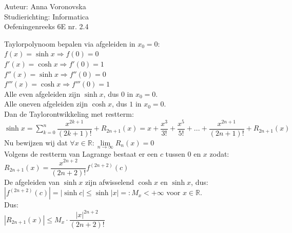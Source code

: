 \documentclass[a4paper]{article}
\begin{document}
  
\noindent \large Auteur: Anna Voronovska \\
\noindent \large Studierichting: Informatica\\
\noindent \large Oefeningenreeks 6E nr. 2.4\\

\medskip

\normalsize


Taylorpolynoom bepalen via afgeleiden in $x_0 = 0$:\\

$f(x) = \sinh x \Rightarrow f(0) = 0$\\

$f'(x) = \cosh x \Rightarrow f'(0) = 1$\\

$f''(x) = \sinh x \Rightarrow f''(0) = 0$\\

$f'''(x) = \cosh x \Rightarrow f'''(0) = 1$\\

Alle even afgeleiden zijn $\sinh x$, dus $0$ in $x_0=0$.\\

Alle oneven afgeleiden zijn $\cosh x$, dus $1$ in $x_0=0$.\\

Dan de Taylorontwikkeling met restterm:\\

$\sinh x = \displaystyle\sum_{k=0}^{n} \dfrac{x^{2k+1}}{(2k+1)!} + R_{2n+1}(x) = x + \dfrac{x^3}{3!} + \dfrac{x^5}{5!} + ... + \dfrac{x^{2n+1}}{(2n+1)!} + R_{2n+1}(x)$\\

Nu bewijzen wij dat $\forall x \in \mathbb{R} : \lim\limits_{n \to \infty} R_n(x) = 0$\\

Volgens de restterm van Lagrange bestaat er een $c$ tussen $0$ en $x$ zodat:\\

$R_{2n+1}(x) = \dfrac{x^{2n+2}}{(2n+2)!} f^{(2n+2)}(c)$\\

De afgeleiden van $\sinh x$ zijn afwisselend $\cosh x$ en $\sinh x$, dus:\\

$\left|f^{(2n+2)}(c)\right| = |\sinh c| \leq \sinh|x| =: M_x < +\infty$ voor $x \in \mathbb{R}$. \\

Dus:\\

$\left|R_{2n+1}(x)\right| \leq M_x \cdot \dfrac{|x|^{2n+2}}{(2n+2)!}$\\
\end{document}
